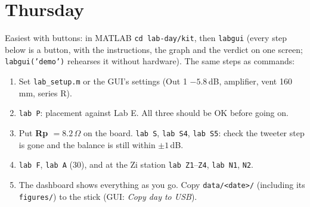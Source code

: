 \documentclass[11pt,a4paper]{article}
\begin{document}
\section{Thursday}
Easiest with buttons: in MATLAB \texttt{cd lab-day/kit}, then \texttt{labgui} (every step below is a button, with the
instructions, the graph and the verdict on one screen; \texttt{labgui('demo')} rehearses it without hardware).
The same steps as commands:
\begin{enumerate}[leftmargin=*]
\item Set \texttt{lab\_setup.m} or the GUI's settings (Out 1 $-5.8$\,dB, amplifier, vent 160\,mm, series R).
\item \texttt{lab P}: placement against Lab E. All three should be OK before going on.
\item Put \textbf{Rp $= 8.2\,\Omega$} on the board. \texttt{lab S}, \texttt{lab S4}, \texttt{lab S5}: check the tweeter step is gone and the balance is still within $\pm1$\,dB.
\item \texttt{lab F}, \texttt{lab A} (30\textdegree), and at the Zi station \texttt{lab Z1}--\texttt{Z4}, \texttt{lab N1}, \texttt{N2}.
\item The dashboard shows everything as you go. Copy \texttt{data/<date>/} (including its \texttt{figures/}) to the stick (GUI: \emph{Copy day to USB}).
\end{enumerate}
\end{document}
